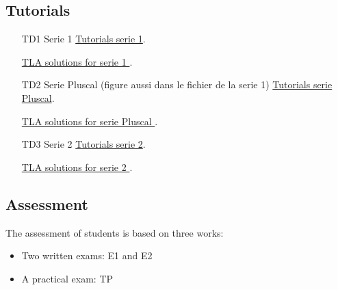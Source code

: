 \documentclass[ 12pt]{article}
\begin{document}
  

\subsection{Tutorials}

  \begin{itemize}
  \item[TD1]   Serie  1
    \href{http://mery54.github.io/teaching/aspd/lecturesnotes/aspd-app-td1.pdf}{Tutorials 
      serie 1}.

        \href{http://mery54.github.io/teaching/aspd/models/tlatd1.zip}{TLA 
           solutions for serie 1
         }.

\item[TD2]   Serie  Pluscal (figure aussi dans le fichier de la serie 1)
    \href{http://mery54.github.io/teaching/aspd/lecturesnotes/aspd-app-pluscal.pdf}{Tutorials 
      serie Pluscal}.

        \href{http://mery54.github.io/teaching/aspd/models/tdpluscal.zip}{TLA 
           solutions for serie Pluscal
         }.
         

         
\item[TD3]   Serie  2
    \href{http://mery54.github.io/teaching/aspd/lecturesnotes/aspd-app-td2.pdf}{Tutorials 
      serie 2}.

        \href{http://mery54.github.io/teaching/aspd/models/tlatd2.zip}{TLA 
           solutions for serie 2
         }.

           \end{itemize}

  
  
  \subsection{Assessment}
\label{sec:project}

The assessment  of students is based on three works:
\begin{itemize}
\item Two  written  exams: E1 and E2
\item  A practical exam: TP
 \end{itemize}





\end{document}
